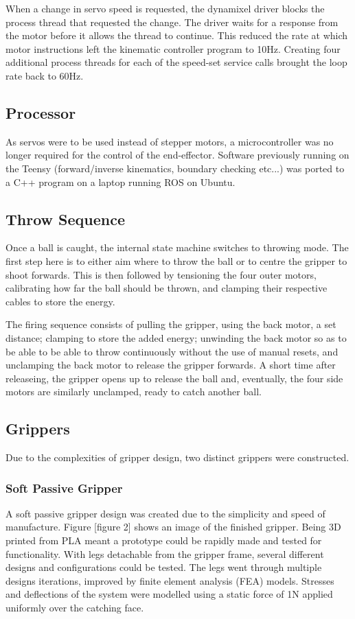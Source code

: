 \documentclass[conference]{IEEEtran}
\begin{document}
When a change in servo speed is requested, the dynamixel driver blocks the process thread that requested the change. The driver waits for a response from the motor before it allows the thread to continue. This reduced the rate at which motor instructions left the kinematic controller program to 10Hz. Creating four additional process threads for each of the speed-set service calls brought the loop rate back to 60Hz.

\subsection{Processor}
As servos were to be used instead of stepper motors, a microcontroller was no longer required for the control of the end-effector. Software previously running on the Teensy (forward/inverse kinematics, boundary checking etc...) was ported to a C++ program on a laptop running ROS on Ubuntu. 

\subsection{Throw Sequence}
Once a ball is caught, the internal state machine switches to throwing mode. The first step here is to either aim where to throw the ball or to centre the gripper to shoot forwards. This is then followed by tensioning the four outer motors, calibrating how far the ball should be thrown, and clamping their respective cables to store the energy.

The firing sequence consists of pulling the gripper, using the back motor, a set distance; clamping to store the added energy; unwinding the back motor so as to be able to be able to throw continuously without the use of manual resets, and unclamping the back motor to release the gripper forwards. A short time after releaseing, the gripper opens up to release the ball and, eventually, the four side motors are similarly unclamped, ready to catch another ball.

\subsection{Grippers}
Due to the complexities of gripper design, two distinct grippers were constructed.
\subsubsection{Soft Passive Gripper}
A soft passive gripper design was created due to the simplicity and speed of manufacture. Figure [figure 2] shows an image of the finished gripper.
Being 3D printed from PLA meant a prototype could be rapidly made and tested for functionality. With legs detachable from the gripper frame, several different designs and configurations could be tested. The legs went through multiple designs iterations, improved by finite element analysis (FEA) models. Stresses and deflections of the system were modelled using a static force of 1N applied uniformly over the catching face.
\end{document}

